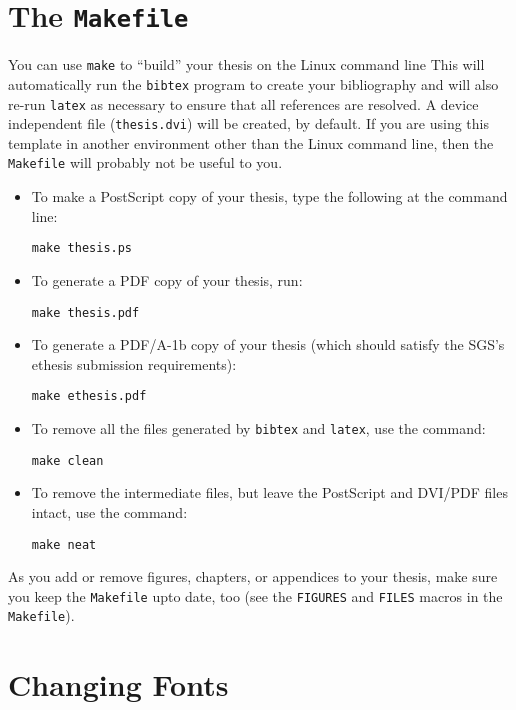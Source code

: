 \section{The \texttt{Makefile}}

You can use \texttt{make} to ``build'' your thesis on the Linux command
line This will
automatically run the \texttt{bibtex} program to create your bibliography
and will also re-run \texttt{latex} as necessary to ensure that all
references are resolved.  A device independent file (\texttt{thesis.dvi})
will be created, by default.  If you are using this template in another
environment other than the Linux command line, then the \texttt{Makefile}
will probably not be useful to you.

\begin{itemize}
\item To make a PostScript copy of your thesis, type the following
at the command line:

\texttt{make thesis.ps}

\item To generate a PDF copy of your thesis, run:

\texttt{make thesis.pdf}

\item To generate a PDF/A-1b copy of your thesis (which should
satisfy the SGS's ethesis submission requirements):

\texttt{make ethesis.pdf}

\item To remove all the files generated by \texttt{bibtex} and
\texttt{latex}, use the command:

\texttt{make clean}

\item To remove the intermediate files, but leave the PostScript
and DVI/PDF files intact, use the command:

\texttt{make neat}
\end{itemize}

As you add or remove figures, chapters, or appendices to your thesis,
make sure you keep the \texttt{Makefile} upto date, too (see the
\texttt{FIGURES} and \texttt{FILES} macros in the \texttt{Makefile}).

\section{Changing Fonts}

